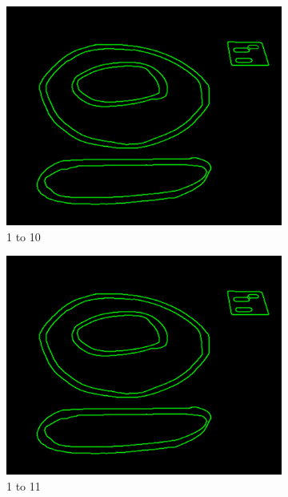 \documentclass[11pt]{article}
\begin{document}
\begin{figure}[H]
	
	\begin{subfigure}[t]{0.32\textwidth}
	\centering
		\includegraphics[scale=0.28]{pics/elimination/joinedAfterRemoval10.png}
		\caption{1 to 10}
		\label{construction10}
	\end{subfigure}
	\begin{subfigure}[t]{0.32\textwidth}
	\centering
		\includegraphics[scale=0.28]{pics/elimination/joinedAfterRemoval11.png}
		\caption{1 to 11}
		\label{construction11}
	\end{subfigure}
	\begin{subfigure}[t]{0.32\textwidth}
	\centering

\end{subfigure}
\end{figure}
\end{document}
